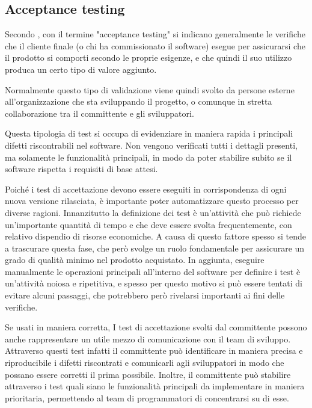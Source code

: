 \subsection{Acceptance testing}

Secondo \cite{KanerFalk}, con il termine "acceptance testing" si indicano generalmente le verifiche che il cliente finale (o chi ha commissionato il software) esegue per assicurarsi che il prodotto si comporti secondo le proprie esigenze, e che quindi il suo utilizzo produca un certo tipo di valore aggiunto.

Normalmente questo tipo di validazione viene quindi svolto da persone esterne all'organizzazione che sta sviluppando il progetto, o comunque in stretta collaborazione tra il committente e gli sviluppatori. 

Questa tipologia di test si occupa di evidenziare in maniera rapida i principali difetti riscontrabili nel software. Non vengono verificati tutti i dettagli presenti, ma solamente le funzionalità principali, in modo da poter stabilire subito se il software rispetta i requisiti di base attesi.

Poiché i test di accettazione devono essere eseguiti in corrispondenza di ogni nuova versione rilasciata, è importante poter automatizzare questo processo per diverse ragioni. Innanzitutto la definizione dei test è un'attività che può richiede un'importante quantità di tempo e che deve essere svolta frequentemente, con relativo dispendio di risorse economiche. A causa di questo fattore spesso si tende a trascurare questa fase, che però svolge un ruolo fondamentale per assicurare un grado di qualità minimo nel prodotto acquistato. In aggiunta, eseguire manualmente le operazioni principali all'interno del software per definire i test è un'attività noiosa e ripetitiva, e spesso per questo motivo si può essere tentati di evitare alcuni passaggi, che potrebbero però rivelarsi importanti ai fini delle verifiche.

Se usati in maniera corretta, I test di accettazione svolti dal committente possono anche rappresentare un utile mezzo di comunicazione con il team di sviluppo. Attraverso questi test infatti il committente può identificare in maniera precisa e riproducibile i difetti riscontrati e comunicarli agli sviluppatori in modo che possano essere corretti il prima possibile. Inoltre, il committente può stabilire attraverso i test quali siano le funzionalità principali da implementare in maniera prioritaria, permettendo al team di programmatori di concentrarsi su di esse.

